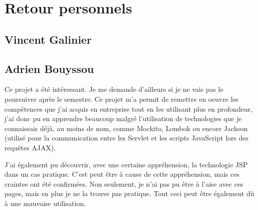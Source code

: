 \documentclass[12pt]{article}		%
\begin{document}
\pagebreak

\section{Retour personnels}

\subsection{Vincent Galinier}

\subsection{Adrien Bouyssou}

Ce projet a été intéressant. Je me demande d'ailleurs si je ne vais pas le poursuivre après le semestre. Ce projet m'a permit de remettre en oeuvre les compétences que j'ai acquis en entreprise tout en les utilisant plus en profondeur, j'ai donc pu en apprendre beaucoup malgré l'utilisation de technologies que je connaissais déjà, au moins de nom, comme Mockito, Lombok ou encore Jackson (utilisé pour la communication entre les Servlet et les scripts JavaScript lors des requêtes AJAX).

J'ai également pu découvrir, avec une certaine appréhension, la technologie JSP dans un cas pratique. C'est peut être à cause de cette appréhension, mais ces craintes ont été confirmées. Non seulement, je n'ai pas pu être à l'aise avec ces pages, mais en plus je ne la trouve pas pratique. Tout ceci peut être également dû à une mauvaise utilisation.
\end{document}
